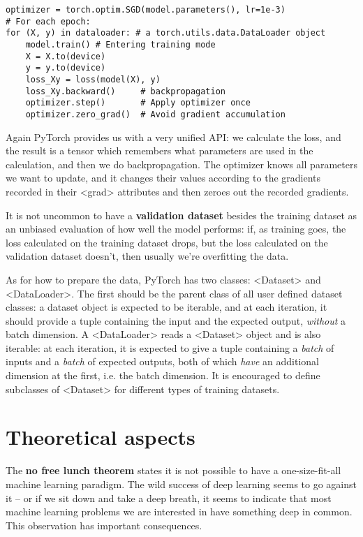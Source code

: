 \documentclass[hyperref, a4paper, 12pt]{report}
\newcommand*{\concept}[1]{{\textbf{#1}}}
\def\texttt#1{<#1>}%
\newcommand{\shortcode}[1]{\texttt{#1}}
\begin{document}
\begin{lstlisting}
optimizer = torch.optim.SGD(model.parameters(), lr=1e-3)
# For each epoch:
for (X, y) in dataloader: # a torch.utils.data.DataLoader object
    model.train() # Entering training mode 
    X = X.to(device)
    y = y.to(device)
    loss_Xy = loss(model(X), y)
    loss_Xy.backward()     # backpropagation
    optimizer.step()       # Apply optimizer once 
    optimizer.zero_grad()  # Avoid gradient accumulation
\end{lstlisting}

Again PyTorch provides us with a very unified API:
we calculate the loss, and the result is a tensor which remembers what parameters are used in the calculation,
and then we do backpropagation.
The optimizer knows all parameters we want to update,
and it changes their values according to the gradients recorded in their \shortcode{grad} attributes
and then zeroes out the recorded gradients.

It is not uncommon to have a \concept{validation dataset} besides the training dataset
as an unbiased evaluation of how well the model performs:
if, as training goes, the loss calculated on the training dataset drops,
but the loss calculated on the validation dataset doesn't,
then usually we're overfitting the data.

As for how to prepare the data,
PyTorch has two classes: \shortcode{Dataset} and \shortcode{DataLoader}.
The first should be the parent class of all user defined dataset classes:
a dataset object is expected to be iterable,
and at each iteration, it should provide a tuple
containing the input and the expected output,
\emph{without} a batch dimension.
A \shortcode{DataLoader} reads a \shortcode{Dataset} object and is also iterable:
at each iteration, it is expected to give a tuple 
containing a \emph{batch} of inputs and a \emph{batch} of expected outputs,
both of which \emph{have} an additional dimension at the first, i.e. the batch dimension.
It is encouraged to define subclasses of \shortcode{Dataset}
for different types of training datasets.

\section{Theoretical aspects}\label{sec:theoretical-aspects}

The \concept{no free lunch theorem} states it is not possible to have a one-size-fit-all machine learning paradigm.
The wild success of deep learning seems to go against it -- or if we sit down and take a deep breath, it seems to indicate that most machine learning problems we are interested in have something deep in common.
This observation has important consequences.
\end{document}
